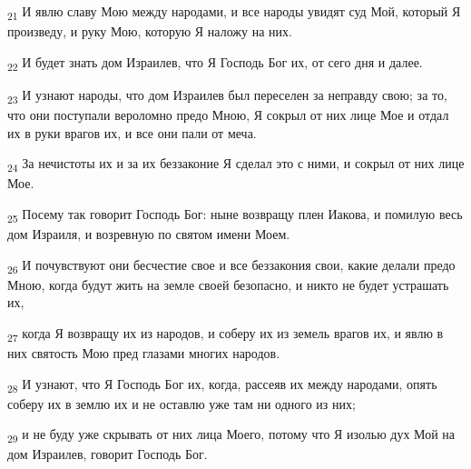 \begin{tcolorbox}
\textsubscript{21} И явлю славу Мою между народами, и все народы увидят суд Мой, который Я произведу, и руку Мою, которую Я наложу на них.
\end{tcolorbox}
\begin{tcolorbox}
\textsubscript{22} И будет знать дом Израилев, что Я Господь Бог их, от сего дня и далее.
\end{tcolorbox}
\begin{tcolorbox}
\textsubscript{23} И узнают народы, что дом Израилев был переселен за неправду свою; за то, что они поступали вероломно предо Мною, Я сокрыл от них лице Мое и отдал их в руки врагов их, и все они пали от меча.
\end{tcolorbox}
\begin{tcolorbox}
\textsubscript{24} За нечистоты их и за их беззаконие Я сделал это с ними, и сокрыл от них лице Мое.
\end{tcolorbox}
\begin{tcolorbox}
\textsubscript{25} Посему так говорит Господь Бог: ныне возвращу плен Иакова, и помилую весь дом Израиля, и возревную по святом имени Моем.
\end{tcolorbox}
\begin{tcolorbox}
\textsubscript{26} И почувствуют они бесчестие свое и все беззакония свои, какие делали предо Мною, когда будут жить на земле своей безопасно, и никто не будет устрашать их,
\end{tcolorbox}
\begin{tcolorbox}
\textsubscript{27} когда Я возвращу их из народов, и соберу их из земель врагов их, и явлю в них святость Мою пред глазами многих народов.
\end{tcolorbox}
\begin{tcolorbox}
\textsubscript{28} И узнают, что Я Господь Бог их, когда, рассеяв их между народами, опять соберу их в землю их и не оставлю уже там ни одного из них;
\end{tcolorbox}
\begin{tcolorbox}
\textsubscript{29} и не буду уже скрывать от них лица Моего, потому что Я изолью дух Мой на дом Израилев, говорит Господь Бог.
\end{tcolorbox}
